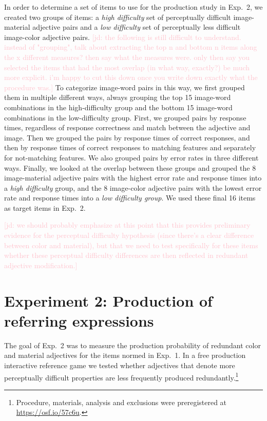 \documentclass[12pt,letterpaper]{article}
\newcommand{\jd}[1]{\textcolor{Pink}{[jd: #1]}}
\begin{document}
In order to determine a set of items to use for the production study in Exp.~2, we created two groups of items:  a \textit{high difficulty} set of perceptually difficult image-material adjective pairs and a  \textit{low difficulty} set of perceptually less difficult image-color adjective pairs. \jd{the following is still difficult to understand. instead of "grouping", talk about extracting the top n and bottom n items along the x different measures? then say what the measures were. only then say you selected the items that had the most overlap (in what way, exactly?) be much more explicit. i'm happy to cut this down once you write down exactly what the procedure was.} To categorize  image-word pairs in this way, we first grouped them in multiple different ways, always grouping the top 15 image-word combinations in the high-difficulty group and the bottom 15 image-word combinations in the low-difficulty group. First, we grouped pairs by response times, regardless of response correctness and match between the adjective and image. Then we grouped the pairs by response times of correct responses, and then by response times of correct responses to matching features and separately for not-matching features. We also grouped pairs by error rates in three different ways. Finally, we looked at the overlap between these groups and grouped the 8 image-material adjective pairs with the highest error rate and response times into a \textit{high difficulty} group, and the 8 image-color adjective pairs with the lowest error rate and response times into a \textit{low difficulty group}. We used these final 16 items as target items in Exp.~2.

\jd{we should probably emphasize  at this point that this provides preliminary evidence for the perceptual difficulty hypothesis (since there's a clear difference between color and material), but that we need to test specifically for these items whether these perceptual difficulty differences are then reflected in redundant adjective modification.}

\section{Experiment 2: Production of referring expressions} 

The goal of Exp.~2 was to measure the production probability of redundant color and material adjectives for the items normed in Exp.~1. In a free production interactive reference game we tested whether adjectives that denote more perceptually difficult properties are less frequently produced redundantly.\footnote{Procedure, materials, analysis and exclusions were preregistered at \href {https://osf.io/57c6u}{https://osf.io/57c6u}.}
\end{document}
